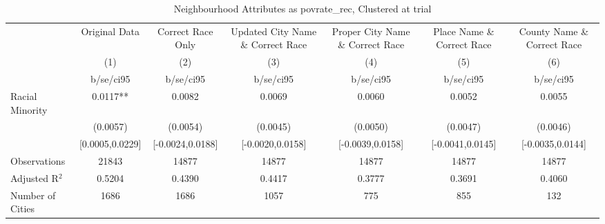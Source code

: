 \documentclass{article}
\begin{document}
\begin{table}[htbp]\centering
\def\sym#1{\ifmmode^{#1}\else\(^{#1}\)\fi}
\caption{Neighbourhood Attributes as povrate\_rec, Clustered at trial}
\begin{tabular}{l*{6}{c}}
\toprule
                    &\multicolumn{1}{c}{Original Data}&\multicolumn{1}{c}{Correct Race Only}&\multicolumn{1}{c}{Updated City Name \& Correct Race}&\multicolumn{1}{c}{Proper City Name \& Correct Race}&\multicolumn{1}{c}{Place Name \& Correct Race}&\multicolumn{1}{c}{County Name \& Correct Race}\\\cmidrule(lr){2-2}\cmidrule(lr){3-3}\cmidrule(lr){4-4}\cmidrule(lr){5-5}\cmidrule(lr){6-6}\cmidrule(lr){7-7}
                    &\multicolumn{1}{c}{(1)}   &\multicolumn{1}{c}{(2)}   &\multicolumn{1}{c}{(3)}   &\multicolumn{1}{c}{(4)}   &\multicolumn{1}{c}{(5)}   &\multicolumn{1}{c}{(6)}   \\
                    &   b/se/ci95   &   b/se/ci95   &   b/se/ci95   &   b/se/ci95   &   b/se/ci95   &   b/se/ci95   \\
\midrule
Racial Minority     &      0.0117** &      0.0082   &      0.0069   &      0.0060   &      0.0052   &      0.0055   \\
                    &    (0.0057)   &    (0.0054)   &    (0.0045)   &    (0.0050)   &    (0.0047)   &    (0.0046)   \\
                    &[0.0005,0.0229]   &[-0.0024,0.0188]   &[-0.0020,0.0158]   &[-0.0039,0.0158]   &[-0.0041,0.0145]   &[-0.0035,0.0144]   \\
\midrule
Observations        &       21843   &       14877   &       14877   &       14877   &       14877   &       14877   \\
Adjusted R$^2$      &      0.5204   &      0.4390   &      0.4417   &      0.3777   &      0.3691   &      0.4060   \\
Number of Cities    &        1686   &        1686   &        1057   &         775   &         855   &         132   \\
\bottomrule
\end{tabular}
\end{table}
\end{document}
